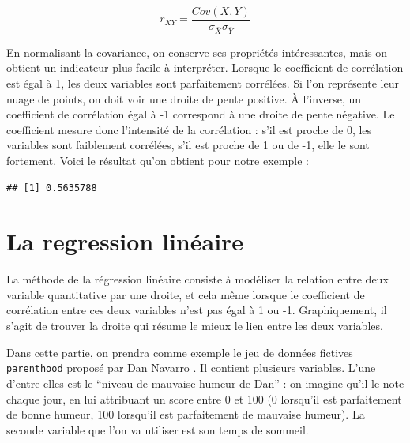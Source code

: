 \documentclass[
  french,
]{book}
\newenvironment{Shaded}{\begin{snugshade}}{\end{snugshade}}
\newcommand{\FunctionTok}[1]{\textcolor[rgb]{0.00,0.00,0.00}{#1}}
\newcommand{\NormalTok}[1]{#1}
\newcommand{\SpecialCharTok}[1]{\textcolor[rgb]{0.00,0.00,0.00}{#1}}
\begin{document}
\[ r_{XY} = \frac{Cov(X,Y)}{\sigma_{\bar{X}}\sigma_{\bar{Y}}} \]

En normalisant la covariance, on conserve ses propriétés intéressantes,
mais on obtient un indicateur plus facile à interpréter. Lorsque le
coefficient de corrélation est égal à 1, les deux variables sont
parfaitement corrélées. Si l'on représente leur nuage de points, on doit
voir une droite de pente positive. À l'inverse, un coefficient de
corrélation égal à -1 correspond à une droite de pente négative. Le coefficient mesure donc l'intensité de la corrélation : s'il est proche de 0, les variables sont faiblement corrélées, s'il est proche de 1 ou de -1, elle le sont fortement. Voici
le résultat qu'on obtient pour notre exemple :

\begin{Shaded}
\end{Shaded}

\begin{verbatim}
## [1] 0.5635788
\end{verbatim}

\hypertarget{la-regression-linuxe9aire}{%
\section{La regression linéaire}\label{la-regression-linuxe9aire}}

La méthode de la régression linéaire consiste à modéliser la relation
entre deux variable quantitative par une droite, et cela même lorsque le
coefficient de corrélation entre ces deux variables n'est pas égal à 1
ou -1. Graphiquement, il s'agit de trouver la droite qui résume le mieux
le lien entre les deux variables.

Dans cette partie, on prendra comme exemple le jeu de données fictives \texttt{parenthood} proposé par Dan Navarro \citep{navarro2015}. Il contient plusieurs
variables. L'une d'entre elles est le ``niveau de mauvaise humeur de Dan''
: on imagine qu'il le note chaque jour, en lui attribuant un score entre
0 et 100 (0 lorsqu'il est parfaitement de bonne humeur, 100 lorsqu'il est parfaitement de mauvaise humeur). La seconde variable que l'on va utiliser est son temps de sommeil.
\end{document}
